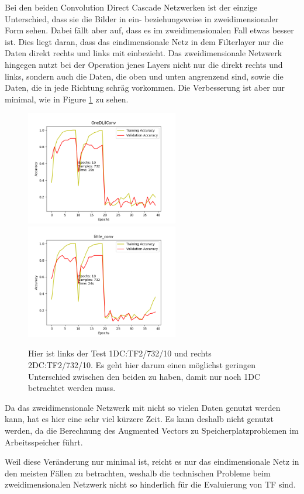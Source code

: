 Bei den beiden Convolution Direct Cascade Netzwerken ist der einzige Unterschied, dass sie die Bilder in ein- beziehungsweise in 
zweidimensionaler Form sehen. Dabei fällt aber auf, dass es im zweidimensionalen Fall etwas besser ist. 
Dies liegt daran, dass das eindimensionale Netz in dem Filterlayer nur die Daten direkt rechts und links mit einbezieht. Das 
zweidimensionale Netzwerk hingegen nutzt bei der Operation jenes Layers nicht nur die direkt rechts und links, sondern auch die Daten, 
die oben und unten angrenzend sind, sowie die Daten, die in jede Richtung schräg vorkommen. 
Die Verbesserung ist aber nur minimal, wie in Figure \ref{fig:dim} zu sehen. 

\begin{figure}[htpb]
    \includegraphics[height=5cm]{../../Plots/ba_plots/dimensionality/1dim_tr.png}
    \includegraphics[height=5cm]{../../Plots/ba_plots/dimensionality/2dim_tr.png}
    \caption{\label{fig:dim} 
    \small{Hier ist links der Test 1DC:TF2/732/10 und rechts 2DC:TF2/732/10. Es geht hier darum einen möglichst geringen Unterschied 
    zwischen den beiden zu haben, damit nur noch 1DC betrachtet werden muss.}}
\end{figure}

Da das zweidimensionale Netzwerk mit nicht so vielen Daten genutzt werden kann, hat es hier eine sehr viel kürzere Zeit. Es kann deshalb 
nicht genutzt werden, da die Berechnung des Augmented Vectors zu Speicherplatzproblemen im Arbeitsspeicher führt. 

Weil diese Veränderung nur minimal ist, reicht es nur das eindimensionale Netz in den meisten Fällen zu betrachten, weshalb die technischen 
Probleme beim zweidimensionalen Netzwerk nicht so hinderlich für die Evaluierung von TF sind. 
